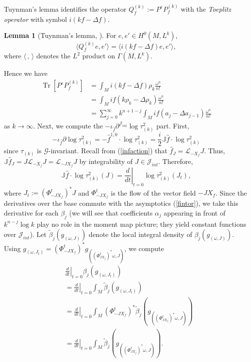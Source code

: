 \documentclass[12pt,reqno,a4paper]{amsart}
\numberwithin{equation}{section}
\DeclareMathOperator{\Tr}{Tr}
\theoremstyle{definition}
\newtheorem{lemma}{Lemma}
\theoremstyle{remark}
\begin{document}
Tuynman's lemma \cite{tuynman1987quantization} identifies the operator $Q^{(k)}_f:=P^\varepsilon P^{(k)}_f$ with the \textit{Toeplitz operator} with symbol $i(kf-\Delta f)$.
\begin{lemma}[Tuynman's lemma, ]
For $e,e'\in H^0(M,L^k)$,
\begin{equation*}
\langle Q^{(k)}_f e,e' \rangle=\langle i(kf-\Delta f)e,e' \rangle,
\end{equation*}
where $\langle\,,\,\rangle$ denotes the $L^2$ product on $\Gamma(M,L^k)$.
\end{lemma}
Hence we have
\begin{align}\label{l2exp}
\Tr[P^\varepsilon P^{(k)}_f]&=\int_M i(kf-\Delta f)\rho_k \frac{\omega^n}{n!}\nonumber\\
&= \int_M i f(k\rho_k-\Delta\rho_k)\frac{\omega^n}{n!}\nonumber\\
&=\sum_{j=0}^\infty k^{n+1-j}\int_M if(a_j-\Delta a_{j-1} )\frac{\omega^n}{n!}
\end{align}
as $k\rightarrow \infty$.
Next, we compute the $-\iota_{\widehat{f}}\partial^{\mathcal{J}_{int}}\log \tau_{(k)}^2$ part. First,
\begin{equation*}
-\iota_{\widehat{f}}\partial\log \tau_{(k)}^2=-\widehat{f}^{1,0}\cdot\log \tau_{(k)}^2= \frac{i}{2}\mathbb{J}\widehat{f}\cdot\log \tau_{(k)}^{2}
\end{equation*}
since $\tau_{(k)}$ is $\mathcal{G}$-invariant. Recall from (\ref{infaction}) that $\widehat{f}_J=\mathcal{L}_{-X_f}J$. Thus, $\mathbb{J}\widehat{f}_J=J\mathcal{L}_{-X_f}J=\mathcal{L}_{-JX_f}J$ by integrability of $J\in\mathcal{J}_{int}$. Therefore,
\begin{equation}\label{integrability}
\mathbb{J}\widehat{f}\cdot\log \tau_{(k)}^2(J)=\left.\frac{d}{dt}\right|_{t=0} \log\tau_{(k)}^2(J_t),
\end{equation}
where $J_t:=\left(\Phi^{t}_{-JX_f}\right)^*J$ and $\Phi^{t}_{-JX_f}$ is the flow of the vector field $-JX_f$. Since the derivatives 
over the base commute with the asymptotics (\ref{fintor}), we take this derivative for each $\beta_{j}$ (we will see that coefficients $\alpha_j$ appearing in front of $k^{n-j}\log k$ play no role in the moment map picture; they yield constant functions over $\mathcal{J}_{int}$). Let $\widetilde{\beta}_j(g_{(\omega,J)})$ denote the local integral density of $\beta_j(g_{(\omega,J)})$. Using $g_{(\omega,J_t)}=\left(\Phi^{t}_{-JX_f}\right)^*g_{((\Phi^{t}_{JX_f})^*\omega,J)}$, we compute
\begin{align*}
&\left.\frac{d}{dt}\right|_{t=0}\beta_j(g_{(\omega,J_t)})\\
&=\left.\frac{d}{dt}\right|_{t=0} \int_M \widetilde{\beta}_j(g_{(\omega,J_t)})\\
&=\left.\frac{d}{dt}\right|_{t=0} \int_M  \left(\Phi^{t}_{-JX_f}\right)^*\widetilde{\beta}_j(g_{((\Phi^{t}_{JX_f})^*\omega,J)})\\
&=\left.\frac{d}{dt}\right|_{t=0} \int_M  \widetilde{\beta}_j(g_{((\Phi^{t}_{JX_f})^*\omega,J)}).
\end{align*}
\end{document}
